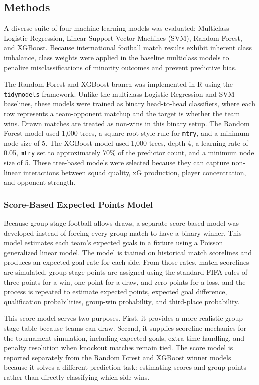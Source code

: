\documentclass[11pt]{article}
\begin{document}
\subsection{Methods}

A diverse suite of four machine learning models was evaluated: Multiclass Logistic Regression, Linear Support Vector Machines (SVM), Random Forest, and XGBoost. Because international football match results exhibit inherent class imbalance, class weights were applied in the baseline multiclass models to penalize misclassifications of minority outcomes and prevent predictive bias.

The Random Forest and XGBoost branch was implemented in R using the \texttt{tidymodels} framework. Unlike the multiclass Logistic Regression and SVM baselines, these models were trained as binary head-to-head classifiers, where each row represents a team-opponent matchup and the target is whether the team wins. Drawn matches are treated as non-wins in this binary setup. The Random Forest model used 1,000 trees, a square-root style rule for \texttt{mtry}, and a minimum node size of 5. The XGBoost model used 1,000 trees, depth 4, a learning rate of 0.05, \texttt{mtry} set to approximately 70\% of the predictor count, and a minimum node size of 5. These tree-based models were selected because they can capture non-linear interactions between squad quality, xG production, player concentration, and opponent strength.

\subsubsection{Score-Based Expected Points Model}
\label{subsec:score_model}
Because group-stage football allows draws, a separate score-based model was developed instead of forcing every group match to have a binary winner. This model estimates each team's expected goals in a fixture using a Poisson generalized linear model. The model is trained on historical match scorelines and produces an expected goal rate for each side. From those rates, match scorelines are simulated, group-stage points are assigned using the standard FIFA rules of three points for a win, one point for a draw, and zero points for a loss, and the process is repeated to estimate expected points, expected goal difference, qualification probabilities, group-win probability, and third-place probability.

This score model serves two purposes. First, it provides a more realistic group-stage table because teams can draw. Second, it supplies scoreline mechanics for the tournament simulation, including expected goals, extra-time handling, and penalty resolution when knockout matches remain tied. The score model is reported separately from the Random Forest and XGBoost winner models because it solves a different prediction task: estimating scores and group points rather than directly classifying which side wins.
\end{document}
